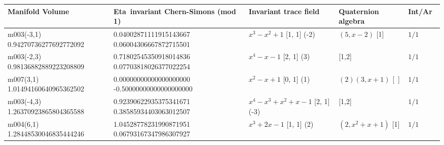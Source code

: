 \documentclass[a4paper]{amsart}
\newcommand{\PreserveBackslash}[1]{\let\temp =\\#1\let\\=\temp}
\theoremstyle{definition}
\begin{document}
\begin{sidewaystable}
\centering
\begin{tabular}{|>{\PreserveBackslash\raggedright}p{4.2cm}| %
>{\PreserveBackslash\raggedright}p{4.2cm}|
	>{\PreserveBackslash\raggedright}p{6cm}|
	>{\PreserveBackslash\raggedright}p{2.4cm}|l|}

\hline

\hbox{Manifold} Volume & \hbox{Eta invariant} Chern-Simons (mod 1)
& Invariant trace field & \hbox{Quaternion} algebra & Int/Ar\ \\

\hline 

m003(-3,1)
0.94270736277692772092 &
0.04002871111915143667 
0.06004306667872715501 &
\hbox{$x^3 - x^2 + 1$} [1, 1] (-2) &
\hbox{$(5, x-2)$} [1]&
$1/1$ \\

\hline 

m003(-2,3)
0.98136882889223208809 &
0.71802545350918014836 
0.07703818026377022254 &
\hbox{$x^4 - x - 1$} [2, 1] (3) &
[1,2] &
$1/1$ \\


\hline 

m007(3,1)
1.01494160640965362502 &
0.00000000000000000000
-0.50000000000000000000 &
\hbox{$x^2 - x + 1$} [0, 1] (1) &
\hbox{$(2) (3, x+1)$} [~]&
$1/1$ \\



\hline 

m003(-4,3)
1.26370923865804365588 &
0.92390622935375341671 
0.38585934403063012507 &
\hbox{$x^4 - x^3 + x^2 + x - 1$} [2, 1] (-3) &
[1,2] &
$1/1$ \\




\hline 

m004(6,1)
1.28448530046835444246 &
1.04528778231990871951 
0.06793167347986307927 &
\hbox{$x^3 + 2x - 1$} [1, 1] (2) &
\hbox{$(2, x^2 + x + 1)$} [1]&
$1/1$ \\



\hline 


\end{tabular}
\end{sidewaystable}
\end{document}
